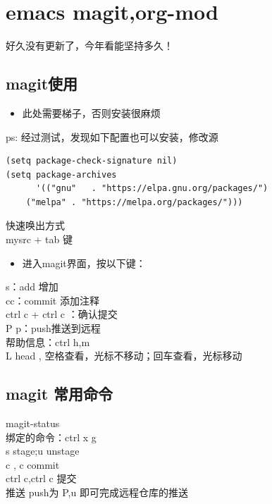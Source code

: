 \documentclass[11pt]{article}
\author{myu}
\date{\today}
\title{}
\begin{document}
\tableofcontents

\section{emacs magit,org-mod}
\label{sec:org79667b1}
好久没有更新了，今年看能坚持多久！\\

\subsection{magit使用}
\label{sec:org30fb43e}
\begin{itemize}
\item 此处需要梯子，否则安装很麻烦\\
\end{itemize}
ps: 经过测试，发现如下配置也可以安装，修改源\\

\begin{verbatim}
(setq package-check-signature nil)
(setq package-archives
      '(("gnu"   . "https://elpa.gnu.org/packages/")
	("melpa" . "https://melpa.org/packages/")))
\end{verbatim}

快速唤出方式\\
mysrc + tab 键\\


\begin{itemize}
\item 进入magit界面，按以下键：\\
\end{itemize}
s：add 增加\\
cc：commit 添加注释\\
ctrl c + ctrl c ：确认提交\\
P p：push推送到远程\\
帮助信息：ctrl h,m\\

L head , 空格查看，光标不移动；回车查看，光标移动\\

\subsection{magit 常用命令}
\label{sec:orgc858967}
magit-status\\
绑定的命令：ctrl x g\\
s stage;u unstage\\
c , c commit\\
ctrl c,ctrl c 提交\\
推送 push为 P,u 即可完成远程仓库的推送\\
\end{document}
